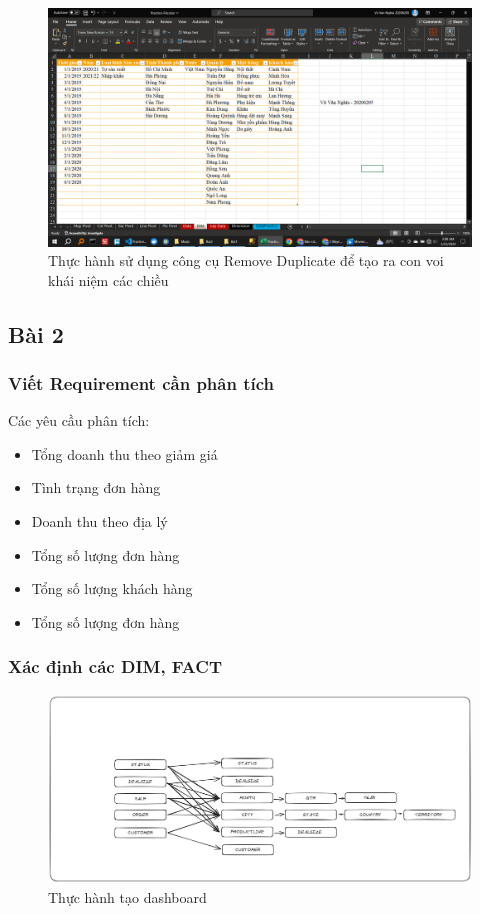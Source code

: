 \documentclass{article}
\begin{document}
\begin{itemize}
\begin{figure}[H]
\centering
\includegraphics[scale = 0.15]{Bai1/ThucHanh/VOI.png}
\caption{Thực hành sử dụng công cụ Remove Duplicate để tạo ra con voi khái niệm các chiều}
\end{figure}

\end{itemize}

\subsection{Bài 2}

 \subsubsection{ Viết Requirement cần phân tích}
 Các yêu cầu phân tích:

 \begin{itemize}
\item      Tổng doanh thu theo giảm giá
\item      Tình trạng đơn hàng
\item      Doanh thu theo địa lý
\item      Tổng số lượng đơn hàng
\item      Tổng số lượng khách hàng
\item      Tổng số lượng đơn hàng
    \end{itemize}

    \subsubsection{ Xác định các DIM, FACT}


    \begin{figure}[H]
        \centering
        \includegraphics[scale = 0.15]{Bai2/ThucHanh/DIM-FACT.png}
        \caption{Thực hành tạo dashboard}
        \end{figure}
\end{document}
